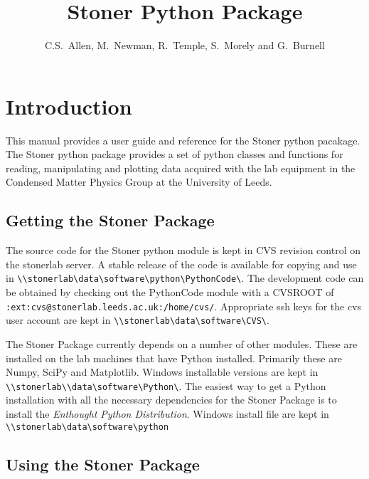\documentclass[a4paper,11pt]{scrartcl}
\author{C.S.~Allen, M.~Newman, R.~Temple, S.~Morely  and G.~Burnell}
\title{Stoner Python Package}
\begin{document}
\maketitle

\tableofcontents
\newpage
\pagestyle{scrheadings} 
\ifoot[\today]{\today}



  \section{Introduction}

This manual provides a user guide and reference for the Stoner python pacakage.
The Stoner python package provides a set of python classes and functions for
reading, manipulating and plotting data acquired with the lab equipment in the
Condensed Matter Physics Group at the University of Leeds.

\subsection{Getting the Stoner Package}

The source code for the Stoner python module is kept in CVS revision control on
the stonerlab server. A stable release of the code is available for copying and
use in \verb#\\stonerlab\data\software\python\PythonCode\#. The development code can
be obtained by checking out the PythonCode module with a CVSROOT of \\
\verb#:ext:cvs@stonerlab.leeds.ac.uk:/home/cvs/#. Appropriate ssh keys for the
cvs user account are kept in \verb#\\stonerlab\data\software\CVS\#.

The Stoner Package currently depends on a number of other modules. These are
installed on the lab machines that have Python installed. Primarily these are
Numpy, SciPy and Matplotlib. Windows installable versions are kept in \\
\verb#\\stonerlab\\data\software\Python\#.  The easiest way to get a Python
installation with all the necessary dependencies for the Stoner Package is to
install the \textit{Enthought Python Distribution}. Windows install file are
kept in \verb#\\stonerlab\data\software\python#


\subsection{Using the Stoner Package}
\end{document}
